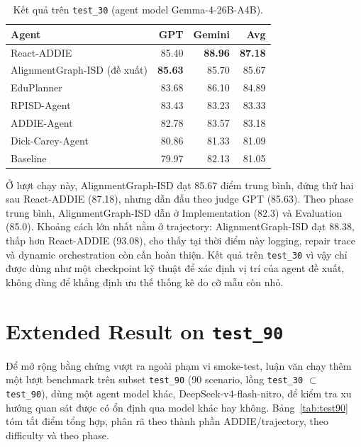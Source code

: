 \documentclass[../main.tex]{subfiles}
\begin{document}
\begin{table}[H]
\centering
\small
\caption{Kết quả trên \texttt{test\_30} (agent model Gemma-4-26B-A4B).}
\label{tab:test30}
\begin{tabular}{lrrr}
\hline
\textbf{Agent} & \textbf{GPT} & \textbf{Gemini} & \textbf{Avg} \\
\hline
React-ADDIE & 85.40 & \textbf{88.96} & \textbf{87.18} \\
AlignmentGraph-ISD (đề xuất) & \textbf{85.63} & 85.70 & 85.67 \\
EduPlanner & 83.68 & 86.10 & 84.89 \\
RPISD-Agent & 83.43 & 83.23 & 83.33 \\
ADDIE-Agent & 82.78 & 83.57 & 83.18 \\
Dick-Carey-Agent & 80.86 & 81.33 & 81.09 \\
Baseline & 79.97 & 82.13 & 81.05 \\
\hline
\end{tabular}
\end{table}

Ở lượt chạy này, AlignmentGraph-ISD đạt 85.67 điểm trung bình, đứng thứ hai sau React-ADDIE (87.18), nhưng dẫn đầu theo judge GPT (85.63). Theo phase trung bình, AlignmentGraph-ISD dẫn ở Implementation (82.3) và Evaluation (85.0). Khoảng cách lớn nhất nằm ở trajectory: AlignmentGraph-ISD đạt 88.38, thấp hơn React-ADDIE (93.08), cho thấy tại thời điểm này logging, repair trace và dynamic orchestration còn cần hoàn thiện. Kết quả trên \texttt{test\_30} vì vậy chỉ được dùng như một checkpoint kỹ thuật để xác định vị trí của agent đề xuất, không dùng để khẳng định ưu thế thống kê do cỡ mẫu còn nhỏ.

\section{Extended Result on \texttt{test\_90}}

Để mở rộng bằng chứng vượt ra ngoài phạm vi smoke-test, luận văn chạy thêm một lượt benchmark trên subset \texttt{test\_90} (90 scenario, lồng \texttt{test\_30} $\subset$ \texttt{test\_90}), dùng một agent model khác, DeepSeek-v4-flash-nitro, để kiểm tra xu hướng quan sát được có ổn định qua model khác hay không. Bảng~\ref{tab:test90} tóm tắt điểm tổng hợp, phân rã theo thành phần ADDIE/trajectory, theo difficulty và theo phase.
\end{document}
